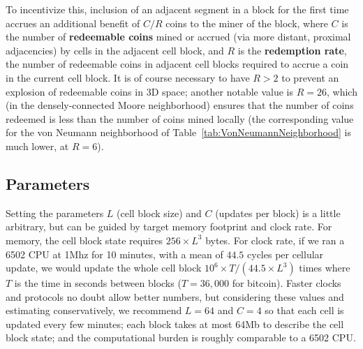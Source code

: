 \documentclass{article}
\newcommand\hex[1]{{\tt #1}}
\begin{document}
To incentivize this,
inclusion of an adjacent segment in a block for the first time
accrues an additional benefit of $C/R$ coins to the miner of the block,
where $C$ is the number of {\bf redeemable coins} mined or accrued (via more distant, proximal adjacencies)
by cells in the adjacent cell block,
and $R$ is the {\bf redemption rate}, the number of redeemable coins in adjacent cell blocks
required to accrue a coin in the current cell block.
It is of course necessary to have $R>2$ to prevent an explosion of redeemable coins in 3D space;
another notable value is $R=26$, which (in the densely-connected Moore neighborhood)
ensures that the number of coins redeemed is less than the number of coins mined locally
(the corresponding value for the von Neumann neighborhood of Table~\ref{tab:VonNeumannNeighborhood}
is much lower, at $R=6$).

\subsection{Parameters}

Setting the parameters $L$ (cell block size) and $C$ (updates per block)
is a little arbitrary, but can be guided by target memory footprint and clock rate.
For memory, the cell block state requires $256 \times L^3$ bytes.
For clock rate, if we ran a 6502 CPU at 1Mhz for 10 minutes, with a mean of $44.5$ cycles per cellular update,
we would update the whole cell block $10^6 \times T / (44.5 \times L^3)$ times
where $T$ is the time in seconds between blocks ($T=36,000$ for bitcoin).
Faster clocks and protocols no doubt allow better numbers,
but considering these values and estimating conservatively,
we recommend $L=64$ and $C=4$ so that
each cell is updated every few minutes;
each block takes at most 64Mb to describe the cell block state;
and the computational burden is roughly comparable to a 6502 CPU.

\newcommand\memtable[1]{
\begin{tabular}{lll}
  \hline
  From & To & Contents \\
  \hline
  #1
  \hline
\end{tabular}
}

\newcommand\memrow[4]{
    \hex{{#1}00} & \hex{{#1}FF} & State of cell $(x#2,y#3,z#4)$ \\
}

\newcommand\memz[5]{
  \memrow{#1}{#4}{#5}{-1}
  \memrow{#2}{#4}{#5}{}
  \memrow{#3}{#4}{#5}{+1}
}
\end{document}
